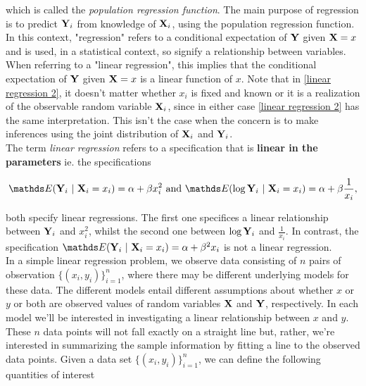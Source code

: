 \documentclass{homework}
\begin{document}
which is called the \textit{population regression function}. The main purpose of regression is to predict ${\bf Y}_i$ from knowledge of ${\bf X}_i$, using the population regression function. In this context, "regression" refers to a conditional expectation of ${\bf Y}$ given ${\bf X} = x$ and is used, in a statistical context, so signify a relationship between variables. When referring to a "linear regression", this implies that the conditional expectation of ${\bf Y}$ given ${\bf X}=x$ is a linear function of $x$. Note that in \eqref{linear regression 2}, it doesn't matter whether $x_i$ is fixed and known or it is a realization of the observable random variable ${\bf X}_i$, since in either case \eqref{linear regression 2} has the same interpretation. This isn't the case when the concern is to make inferences using the joint distribution of ${\bf X}_i$ and ${\bf Y}_i$. \\

The term \textit{linear regression} refers to a specification that is \textbf{linear in the parameters} ie. the specifications 

\begin{align*}
    \E ({\bf Y}_i\blank|\blank{\bf X}_i = x_i) = \alpha + \beta x_i^2 \textnormal{ and } \E (\log {\bf Y}_i\blank|\blank{\bf X}_i = x_i) = \alpha + \beta \frac{1}{x_i},
\end{align*}

both specify linear regressions. The first one specifices a linear relationship between ${\bf Y}_i$ and $x_i^2$, whilst the second one between $\log{\bf Y}_i$ and $\frac{1}{x_i}$. In contrast, the specification $\E ({\bf Y}_i\blank|\blank{\bf X}_i = x_i) = \alpha + \beta^2 x_i$ is not a linear regression. \\

In a simple linear regression problem, we observe data consisting of $n$ pairs of observation $\{(x_i, y_i)\}_{i=1}^n$, where there may be different underlying models for these data. The different models entail different assumptions about whether $x$ or $y$ or both are observed values of random variables ${\bf X}$ and ${\bf Y}$, respectively. In each model we'll be interested in investigating a linear relationship between $x$ and $y$. These $n$ data points will not fall exactly on a straight line but, rather, we're interested in summarizing the sample information by fitting a line to the observed data points. Given a data set $\{(x_i, y_i)\}_{i=1}^n$, we can define the following quantities of interest
\end{document}
